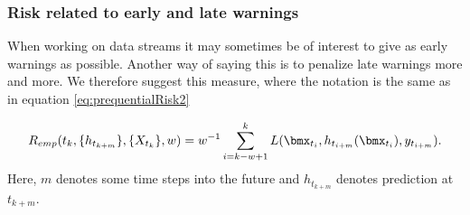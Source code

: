 
\subsubsection{Risk related to early and late warnings}

When working on data streams it may sometimes be of interest to give as early warnings as possible.  Another way of saying this is to penalize late warnings more and more.  We therefore suggest this measure, where the notation is the same as in equation \eqref{eq:prequentialRisk2}

\begin{equation}
\label{eq:prequentialRisk3}
R_{emp}(t_k, \{h_{t_{k+m}}\}, \{X_{t_k}\}, w) = w^{-1} \sum_{i=k - w +1}^k L(\bmx_{t_i} , h_{t_{i+m}}(\bmx_{t_i} ), y_{t_{i+m}}).
\end{equation}
Here, $m$ denotes some time steps into the future and $h_{t_{k+m}}$ denotes prediction at $t_{k+m}$.


%
%
%
%






